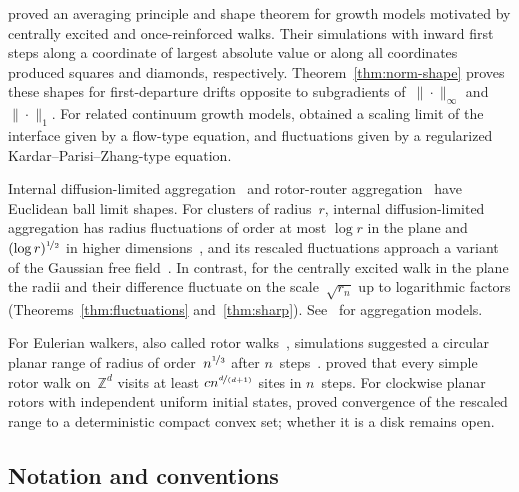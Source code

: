 \documentclass[11pt]{amsart}
\theoremstyle{plain}
\theoremstyle{definition}
\newcommand{\Z}{\mathbb Z}
\newcommand{\nf}{\nicefrac}
\numberwithin{equation}{section}
\begin{document}
\citet{DemboGroismanHuangSidoravicius2021} proved an averaging principle and shape theorem for growth models motivated by centrally excited and once-reinforced walks. Their simulations with inward first steps along a coordinate of largest absolute value or along all coordinates produced squares and diamonds, respectively. Theorem~\ref{thm:norm-shape} proves these shapes for first-departure drifts opposite to subgradients of~$\|\cdot\|_\infty$ and~$\|\cdot\|_1$. For related continuum growth models, \citet*{DemboYang2025Flow,DemboYang2025KPZ} obtained a scaling limit of the interface given by a flow-type equation, and fluctuations given by a regularized Kardar--Parisi--Zhang-type equation.

Internal diffusion-limited aggregation~\citep{LawlerBramsonGriffeath1992} and rotor-router aggregation~\citep{LevinePeres2009} have Euclidean ball limit shapes. For clusters of radius~$r$, internal diffusion-limited aggregation has radius fluctuations of order at most $\log r$ in the plane and $(\log r)^{\nf12}$ in higher dimensions~\citep{JerisonLevineSheffield2012,JerisonLevineSheffield2013,AsselahGaudilliere2013,AsselahGaudilliere2013Polynomial}, and its rescaled fluctuations approach a variant of the Gaussian free field~\citep{JerisonLevineSheffield2014}. In contrast, for the centrally excited walk in the plane the radii and their difference fluctuate on the scale~$\sqrt{r_n}$ up to logarithmic factors (Theorems~\ref{thm:fluctuations} and~\ref{thm:sharp}). See~\citet*{LevinePeres2017} for aggregation models.

For Eulerian walkers, also called rotor walks~\citep{PriezzhevDharDharKrishnamurthy1996}, simulations suggested a circular planar range of radius of order~$n^{\nf13}$ after $n$~steps~\citep{KapriDhar2009}. \citet*{FlorescuLevinePeres2016} proved that every simple rotor walk on~$\Z^d$ visits at least $cn^{\nf{d}{(d+1)}}$ sites in $n$~steps. For clockwise planar rotors with independent uniform initial states, \citet*{BouRabeePeres2026} proved convergence of the rescaled range to a deterministic compact convex set; whether it is a disk remains open.

\subsection{Notation and conventions}\label{sec:notation}
\end{document}
